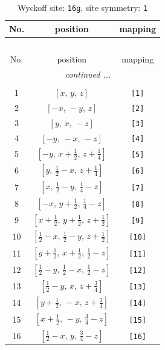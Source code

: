 \documentclass[fleqn,8pt]{jsarticle}
\begin{document}
\begin{longtable}{ccc}
\caption{Wyckoff site: {\tt 16g}, site symmetry: {\tt 1}}
 \\
 \hline \hline
No. & position & mapping \\ \hline \endfirsthead

\multicolumn{2}{l}{\tablename\ \thetable{}} \\
 \hline \hline
No. & position & mapping \\ \hline \endhead

 \hline \hline
\multicolumn{2}{r}{\footnotesize\it continued ...} \\ \endfoot

 \hline \hline
\multicolumn{2}{r}{} \\ \endlastfoot

1 & $\left[ x,\, y,\, z \right]$ & {\tt [1]} \\ \hline
2 & $\left[ - x,\, - y,\, z \right]$ & {\tt [2]} \\ \hline
3 & $\left[ y,\, x,\, - z \right]$ & {\tt [3]} \\ \hline
4 & $\left[ - y,\, - x,\, - z \right]$ & {\tt [4]} \\ \hline
5 & $\left[ - y,\, x + \frac{1}{2},\, z + \frac{1}{4} \right]$ & {\tt [5]} \\ \hline
6 & $\left[ y,\, \frac{1}{2} - x,\, z + \frac{1}{4} \right]$ & {\tt [6]} \\ \hline
7 & $\left[ x,\, \frac{1}{2} - y,\, \frac{1}{4} - z \right]$ & {\tt [7]} \\ \hline
8 & $\left[ - x,\, y + \frac{1}{2},\, \frac{1}{4} - z \right]$ & {\tt [8]} \\ \hline
9 & $\left[ x + \frac{1}{2},\, y + \frac{1}{2},\, z + \frac{1}{2} \right]$ & {\tt [9]} \\ \hline
10 & $\left[ \frac{1}{2} - x,\, \frac{1}{2} - y,\, z + \frac{1}{2} \right]$ & {\tt [10]} \\ \hline
11 & $\left[ y + \frac{1}{2},\, x + \frac{1}{2},\, \frac{1}{2} - z \right]$ & {\tt [11]} \\ \hline
12 & $\left[ \frac{1}{2} - y,\, \frac{1}{2} - x,\, \frac{1}{2} - z \right]$ & {\tt [12]} \\ \hline
13 & $\left[ \frac{1}{2} - y,\, x,\, z + \frac{3}{4} \right]$ & {\tt [13]} \\ \hline
14 & $\left[ y + \frac{1}{2},\, - x,\, z + \frac{3}{4} \right]$ & {\tt [14]} \\ \hline
15 & $\left[ x + \frac{1}{2},\, - y,\, \frac{3}{4} - z \right]$ & {\tt [15]} \\ \hline
16 & $\left[ \frac{1}{2} - x,\, y,\, \frac{3}{4} - z \right]$ & {\tt [16]} \\
\end{longtable}
\end{document}
